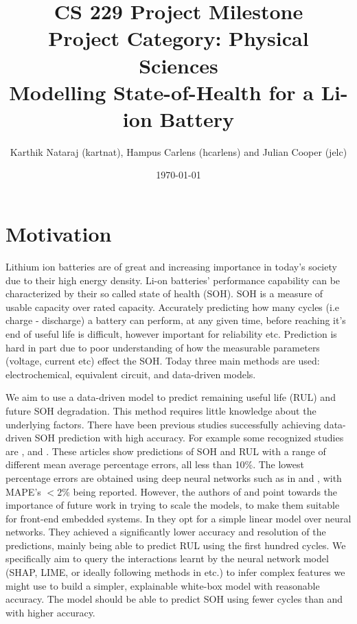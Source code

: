 \documentclass{article}
\title{%
    CS 229 Project Milestone \\
    Project Category: Physical Sciences \\
    Modelling State-of-Health for a Li-ion Battery}
\author{Karthik Nataraj (kartnat), Hampus Carlens (hcarlens) and Julian Cooper (jelc)}
\date{\today}
\begin{document}
\maketitle


\section{Motivation}
Lithium ion batteries are of great and increasing importance in today's society due to their high energy density.  Li-on batteries' performance capability can be characterized by their so called state of health (SOH). SOH is a measure of usable capacity over rated capacity. Accurately predicting how many cycles (i.e charge - discharge) a battery can perform, at any given time, before reaching it’s end of useful life is difficult, however important for reliability etc.  Prediction is hard in part due to poor understanding of how the measurable parameters (voltage, current etc) effect the SOH. Today three main methods are used: electrochemical, equivalent circuit, and data-driven models.

We aim to use a data-driven model to predict remaining useful life (RUL) and future SOH degradation. This method requires little knowledge about the underlying factors. There have been previous studies successfully achieving data-driven SOH prediction with high accuracy. For example some recognized studies are \cite{severson2019data}, \cite{roman2021machine} and \cite{energiesMdpi}. These articles show predictions of SOH and RUL with a range of different mean average percentage errors, all less than 10$\%$.  The lowest percentage errors are obtained using deep neural networks such as in \cite{roman2021machine} and \cite{energiesMdpi}, with MAPE's $< 2 \%$ being reported. However, the authors of \cite{energiesMdpi} and \cite{DariusOld} point towards the importance of future work in trying to scale the models, to make them suitable for front-end embedded systems. In \cite{severson2019data} they opt for a simple linear model over neural networks. They achieved a significantly lower accuracy and resolution of the predictions, mainly being able to predict RUL using the first hundred cycles. We specifically aim to query the interactions learnt by the neural network model (SHAP, LIME, or ideally following methods in \cite{Tsang2018DetectingSI} etc.) to infer complex features we might use to build a simpler, explainable white-box model with reasonable accuracy. The model should be able to predict SOH using fewer cycles than \cite{severson2019data} and with higher accuracy.
\end{document}
